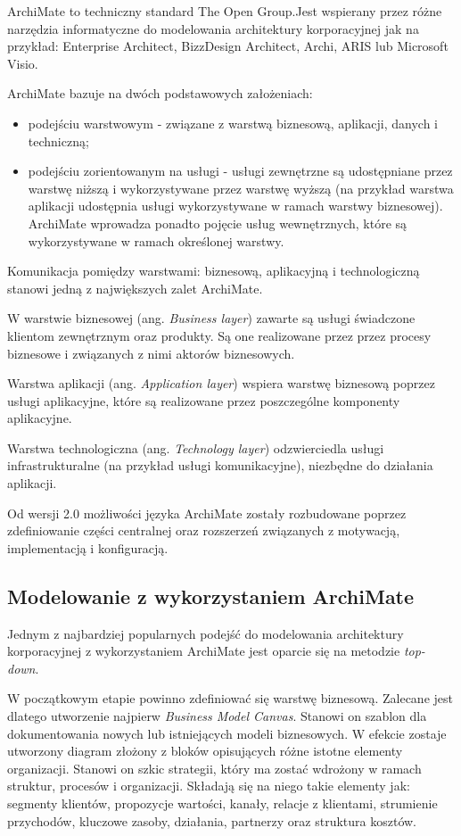 ArchiMate to techniczny standard The Open Group.Jest wspierany przez różne narzędzia informatyczne do modelowania architektury korporacyjnej jak na przykład: Enterprise Architect, BizzDesign Architect, Archi, ARIS lub Microsoft Visio.\cite{OpenGrArch} 

ArchiMate bazuje na dwóch podstawowych założeniach:
\begin{itemize}
\item{podejściu warstwowym - związane z warstwą biznesową, aplikacji, danych i techniczną;}
\item{podejściu zorientowanym na usługi - usługi zewnętrzne są udostępniane przez warstwę niższą i wykorzystywane przez warstwę wyższą (na przykład warstwa aplikacji udostępnia usługi wykorzystywane w ramach warstwy biznesowej). ArchiMate wprowadza ponadto pojęcie usług wewnętrznych, które są wykorzystywane w ramach określonej warstwy.}
\end{itemize}

Komunikacja pomiędzy warstwami: biznesową, aplikacyjną i technologiczną stanowi jedną z największych zalet ArchiMate.

W warstwie biznesowej (ang. \emph{Business layer}) zawarte są usługi świadczone klientom zewnętrznym oraz produkty. Są one realizowane przez przez procesy biznesowe i związanych z nimi aktorów biznesowych.

Warstwa aplikacji (ang. \emph{Application layer}) wspiera warstwę biznesową poprzez usługi aplikacyjne, które są realizowane przez poszczególne komponenty aplikacyjne.

Warstwa technologiczna (ang. \emph{Technology layer}) odzwierciedla usługi infrastrukturalne (na przykład usługi komunikacyjne), niezbędne do działania aplikacji.

Od wersji 2.0 możliwości języka ArchiMate zostały rozbudowane poprzez zdefiniowanie części centralnej oraz rozszerzeń związanych z motywacją, implementacją i konfiguracją.\cite{ArchKorpSob}


\subsection{Modelowanie z wykorzystaniem ArchiMate}
Jednym z najbardziej popularnych podejść do modelowania architektury korporacyjnej z wykorzystaniem ArchiMate jest oparcie się na metodzie \emph{top-down}. 

W początkowym etapie powinno zdefiniować się warstwę biznesową. Zalecane jest dlatego utworzenie najpierw \emph{Business Model Canvas}. Stanowi on szablon dla dokumentowania nowych lub istniejących modeli biznesowych. W efekcie zostaje utworzony diagram złożony z bloków opisujących różne istotne elementy organizacji. Stanowi on szkic strategii, który ma zostać wdrożony w ramach struktur, procesów i organizacji. Składają się na niego takie elementy jak: segmenty klientów, propozycje wartości, kanały, relacje z klientami, strumienie przychodów, kluczowe zasoby, działania, partnerzy oraz struktura kosztów. 

